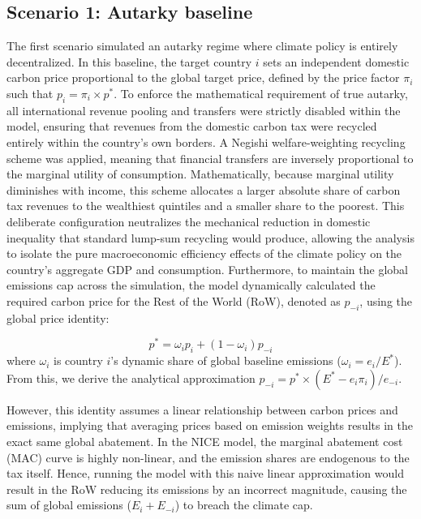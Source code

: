\documentclass[12pt,english]{article}
\begin{document}
\subsection{Scenario 1: Autarky baseline}

The first scenario simulated an autarky regime where climate policy is entirely decentralized. In this baseline, the target country $i$ sets an independent domestic carbon price proportional to the global target price, defined by the price factor $\pi_i$ such that $p_i=\pi_i\times p^*$. To enforce the mathematical requirement of true autarky, all international revenue pooling and transfers were strictly disabled within the model, ensuring that revenues from the domestic carbon tax were recycled entirely within the country's own borders. A Negishi welfare-weighting recycling scheme was applied, meaning that financial transfers are inversely proportional to the marginal utility of consumption. Mathematically, because marginal utility diminishes with income, this scheme allocates a larger absolute share of carbon tax revenues to the wealthiest quintiles and a smaller share to the poorest. This deliberate configuration neutralizes the mechanical reduction in domestic inequality that standard lump-sum recycling would produce, allowing the analysis to isolate the pure macroeconomic efficiency effects of the climate policy on the country's aggregate GDP and consumption. 
Furthermore, to maintain the global emissions cap across the simulation, the model dynamically calculated the required carbon price for the Rest of the World (RoW), denoted as $p_{-i}$, using the global price identity: 

\begin{equation}
    p^* = \omega_i p_i + (1-\omega_i)p_{-i}
    \label{eq:price_identity}
\end{equation}
where $\omega_i$ is country $i$'s dynamic share of global baseline emissions ($\omega_i=e_i/E^*$). From this, we derive the analytical approximation $p_{-i} = p^* \times (E^* - e_i \pi_i) / e_{-i}$.

However, this identity assumes a linear relationship between carbon prices and emissions, implying that averaging prices based on emission weights results in the exact same global abatement. 
In the NICE model, the marginal abatement cost (MAC) curve is highly non-linear, and the emission shares are endogenous to the tax itself. Hence, running the model with this naive linear approximation would result in the RoW reducing its emissions by an incorrect magnitude, causing the sum of global emissions ($E_i + E_{-i}$) to breach the climate cap. 
\end{document}
